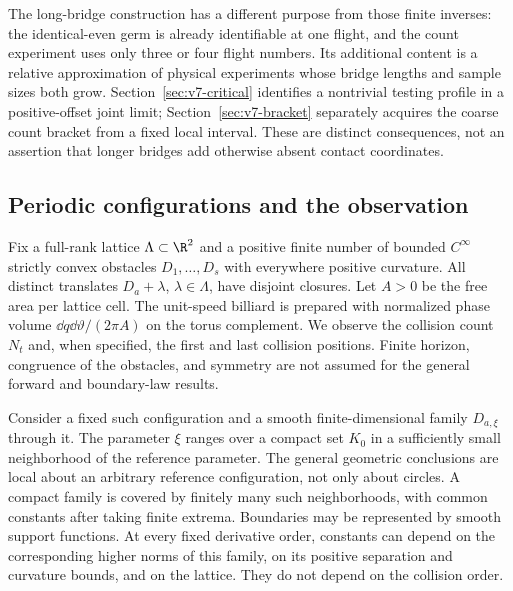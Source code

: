 The long-bridge construction has a different purpose from those finite
inverses: the identical-even germ is already identifiable at one flight,
and the count experiment uses only three or four flight numbers. Its
additional content is a relative approximation of physical experiments
whose bridge lengths and sample sizes both grow. Section~\ref{sec:v7-critical}
identifies a nontrivial testing profile in a positive-offset joint limit;
Section~\ref{sec:v7-bracket} separately acquires the coarse count bracket
from a fixed local interval. These are distinct consequences, not an
assertion that longer bridges add otherwise absent contact coordinates.

\subsection{Periodic configurations and the observation}
Fix a full-rank lattice $\Lambda\subset\R^2$ and a positive finite number of bounded
$C^\infty$ strictly convex obstacles $D_1,\ldots,D_s$ with everywhere
positive curvature. All distinct translates $D_a+\lambda$, $\lambda\in
\Lambda$, have disjoint closures. Let $A>0$ be the free area per lattice
cell. The unit-speed billiard is prepared with normalized phase volume
$\dd q\dd\vartheta/(2\pi A)$ on the torus complement. We observe the
collision count $N_t$ and, when specified, the first and last collision
positions. Finite horizon, congruence of the obstacles, and symmetry
are not assumed for the general forward and boundary-law results.

Consider a fixed such configuration and a smooth finite-dimensional
family $D_{a,\xi}$ through it. The parameter $\xi$ ranges over a compact
set $K_0$ in a sufficiently small neighborhood of the reference parameter.
The general geometric conclusions are local about an arbitrary reference configuration,
not only about circles. A compact family is covered by finitely many
such neighborhoods, with common constants after taking finite extrema.
Boundaries may be represented by smooth support functions. At every
fixed derivative order, constants can depend on the corresponding
higher norms of this family, on its positive separation and curvature
bounds, and on the lattice. They do not depend on the collision order.

